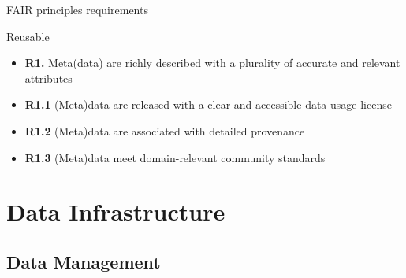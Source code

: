\begin{frame}[allowframebreaks]{FAIR\autocite{Wilkinson_2016} principles requirements}
	\begin{block}{Reusable}
		\begin{itemize}
			\item \textbf{R1.} Meta(data) are richly described with a plurality of accurate and relevant attributes
			\item \textbf{R1.1} (Meta)data are released with a clear and accessible data usage license
			\item \textcolor{UNITSCherry}{\textbf{R1.2} (Meta)data are associated with detailed provenance}
			\item \textcolor{UNITSCherry}{\textbf{R1.3} (Meta)data meet domain-relevant community standards}
		\end{itemize}
	\end{block}
\end{frame}


\section{Data Infrastructure}

\subsection{Data Management}

